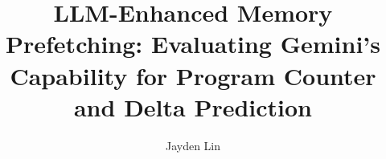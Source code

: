 \documentclass[sigconf,authorversion,nonacm]{acmart}
\begin{document}
\title{LLM-Enhanced Memory Prefetching: Evaluating Gemini's Capability for Program Counter and Delta Prediction}

\author{Jayden Lin}
\affiliation{%
}


\end{document}
